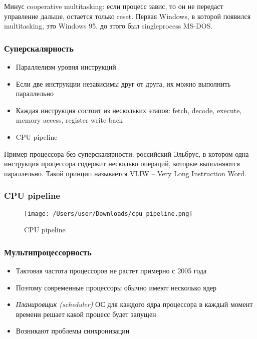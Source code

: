     Минус cooperative multitasking: если процесс завис, то он не передаст управление дальше, остается только reset.\newline
    Первая Windows, в которой появился multitasking, это Windows 95, до этого был singleprocess MS-DOS.
    
    \subsubsection{Суперскалярность}
    \begin{itemize}
      \item Параллелизм уровня инструкций
      \item Если две инструкции независимы друг от друга, их можно выполнить параллельно
      \item Каждая инструкция состоит из нескольких этапов: fetch, decode, execute, memory access, register write back
      \item CPU pipeline
    \end{itemize}
    Пример процессора без суперскалярности: российский Эльбрус, в котором одна инструкция процессора содержит несколько операций, которые выполняются параллельно. Такой принцип называется VLIW -- Very Long Instruction Word.
    
    \subsubsection{CPU pipeline}
    \begin{figure}[H]
    \centering
  \texttt{[image: /Users/user/Downloads/cpu\_pipeline.png]}
  \caption{CPU pipeline}
  \label{fig:pipeline}
\end{figure}
    
    \subsubsection{Мультипроцессорность}
    \begin{itemize}
      \item Тактовая частота процессоров не растет примерно с 2005 года
      \item Поэтому современные процессоры обычно имеют несколько ядер
      \item \textit{Планировщик (scheduler)} ОС для каждого ядра процессора в каждый момент времени решает какой процесс будет запущен
      \item Возникают проблемы синхронизации
    \end{itemize}
    

